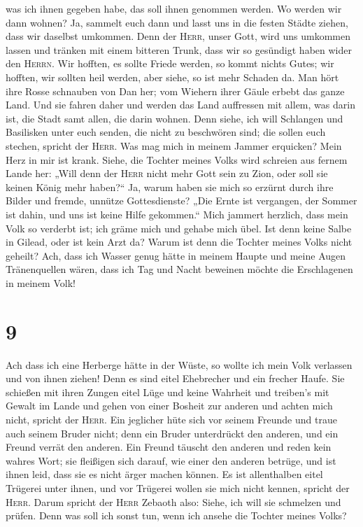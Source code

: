 was ich ihnen gegeben habe, das soll ihnen genommen werden.
 Wo werden wir dann wohnen? Ja, sammelt euch dann und
lasst uns in die festen Städte ziehen, dass wir daselbst umkommen. Denn
der \textsc{Herr}, unser Gott, wird uns umkommen lassen und tränken mit
einem bitteren Trunk, dass wir so gesündigt haben wider den
\textsc{Herrn}.  Wir hofften, es sollte Friede werden, so
kommt nichts Gutes; wir hofften, wir sollten heil werden, aber siehe, so
ist mehr Schaden da.  Man hört ihre Rosse schnauben von
Dan her; vom Wiehern ihrer Gäule erbebt das ganze Land. Und sie fahren
daher und werden das Land auffressen mit allem, was darin ist, die Stadt
samt allen, die darin wohnen.  Denn siehe, ich will
Schlangen und Basilisken unter euch senden, die nicht zu beschwören
sind; die sollen euch stechen, spricht der \textsc{Herr}.
 Was mag mich in meinem Jammer erquicken? Mein Herz in
mir ist krank.  Siehe, die Tochter meines Volks wird
schreien aus fernem Lande her: „Will denn der \textsc{Herr} nicht mehr
Gott sein zu Zion, oder soll sie keinen König mehr haben?{}`` Ja, warum
haben sie mich so erzürnt durch ihre Bilder und fremde, unnütze
Gottesdienste?  „Die Ernte ist vergangen, der Sommer ist
dahin, und uns ist keine Hilfe gekommen.``  Mich jammert
herzlich, dass mein Volk so verderbt ist; ich gräme mich und gehabe mich
übel.  Ist denn keine Salbe in Gilead, oder ist kein Arzt
da? Warum ist denn die Tochter meines Volks nicht geheilt?
 Ach, dass ich Wasser genug hätte in meinem Haupte und
meine Augen Tränenquellen wären, dass ich Tag und Nacht beweinen möchte
die Erschlagenen in meinem Volk!

\hypertarget{section-8}{%
\section{9}\label{section-8}}

 Ach dass ich eine Herberge hätte in der Wüste, so wollte
ich mein Volk verlassen und von ihnen ziehen! Denn es sind eitel
Ehebrecher und ein frecher Haufe.  Sie schießen mit ihren
Zungen eitel Lüge und keine Wahrheit und treiben's mit Gewalt im Lande
und gehen von einer Bosheit zur anderen und achten mich nicht, spricht
der \textsc{Herr}.  Ein jeglicher hüte sich vor seinem
Freunde und traue auch seinem Bruder nicht; denn ein Bruder unterdrückt
den anderen, und ein Freund verrät den anderen.  Ein
Freund täuscht den anderen und reden kein wahres Wort; sie fleißigen
sich darauf, wie einer den anderen betrüge, und ist ihnen leid, dass sie
es nicht ärger machen können.  Es ist allenthalben eitel
Trügerei unter ihnen, und vor Trügerei wollen sie mich nicht kennen,
spricht der \textsc{Herr}.  Darum spricht der
\textsc{Herr} Zebaoth also: Siehe, ich will sie schmelzen und prüfen.
Denn was soll ich sonst tun, wenn ich ansehe die Tochter meines Volks?

